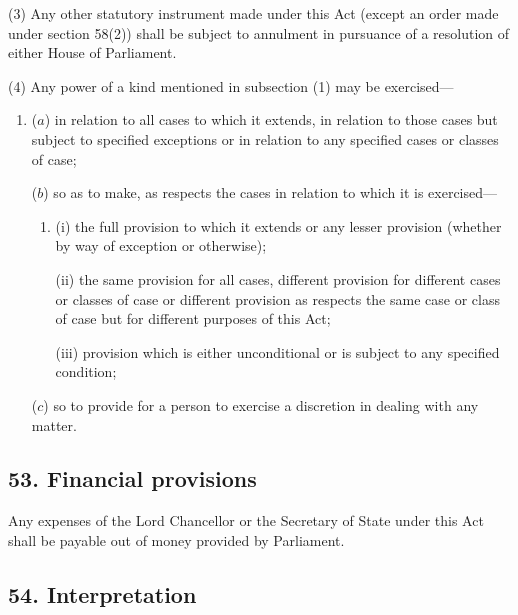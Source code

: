 \documentclass[12pt,a4paper]{article}
\begin{document}
(3) Any other statutory instrument made under this Act (except an order made under section 58(2)) shall be subject to annulment in pursuance of a resolution of either House of Parliament.

(4) Any power of a kind mentioned in subsection (1)  may be exercised—
\begin{enumerate}\item[]
($a$) in relation to all cases to which it extends, in relation to those cases but subject to specified exceptions or in relation to any specified cases or classes of case;

($b$) so as to make, as respects the cases in relation to which it is exercised—
\begin{enumerate}\item[]
(i) the full provision to which it extends or any lesser provision (whether by way of exception or otherwise);

(ii) the same provision for all cases, different provision for different cases or classes of case or different provision as respects the same case or class of case but for different purposes of this Act;

(iii) provision which is either unconditional or is subject to any specified condition;
\end{enumerate}

($c$) so to provide for a person to exercise a discretion in dealing with any matter.
\end{enumerate}


\subsection{53. Financial provisions}

Any expenses of the Lord Chancellor or the Secretary of State under this Act shall be payable out of money provided by Parliament.


\subsection{54. Interpretation}
\end{document}
